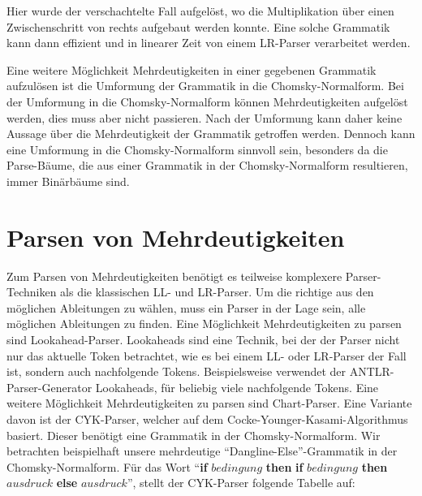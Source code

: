 \documentclass[runningheads]{llncs}
\begin{document}
    Hier wurde der verschachtelte Fall aufgelöst,
    wo die Multiplikation über einen Zwischenschritt von rechts aufgebaut werden konnte.
    Eine solche Grammatik kann dann effizient und in linearer Zeit von einem LR-Parser verarbeitet werden.

    Eine weitere Möglichkeit Mehrdeutigkeiten in einer gegebenen Grammatik aufzulösen
    ist die Umformung der Grammatik in die Chomsky-Normalform.
    Bei der Umformung in die Chomsky-Normalform können Mehrdeutigkeiten aufgelöst werden, dies muss aber nicht passieren\cite{kemp1974automata}.
    Nach der Umformung kann daher keine Aussage über die Mehrdeutigkeit der Grammatik getroffen werden.
    Dennoch kann eine Umformung in die Chomsky-Normalform sinnvoll sein, besonders da die Parse-Bäume,
    die aus einer Grammatik in der Chomsky-Normalform resultieren, immer Binärbäume sind\cite{watrous2020parse}.



    \newpage


    \section{Parsen von Mehrdeutigkeiten}\label{sec:parsen-von-mehrdeutigkeiten}

    Zum Parsen von Mehrdeutigkeiten benötigt es teilweise komplexere Parser-\\Techniken als die klassischen LL- und LR-Parser\cite{thorup1994controlled}.
    Um die richtige aus den möglichen Ableitungen zu wählen,
    muss ein Parser in der Lage sein, alle möglichen Ableitungen zu finden.
    Eine Möglichkeit Mehrdeutigkeiten zu parsen sind Lookahead-Parser.
    Lookaheads sind eine Technik, bei der der Parser nicht nur das aktuelle Token betrachtet,
    wie es bei einem LL- oder LR-Parser der Fall ist, sondern auch nachfolgende Tokens.
    Beispielsweise verwendet der ANTLR-Parser-Generator Lookaheads,
    für beliebig viele nachfolgende Tokens\cite{parr2024definitive}.
    Eine weitere Möglichkeit Mehrdeutigkeiten zu parsen sind Chart-Parser.
    Eine Variante davon ist der CYK-Parser\cite{klaus2009cky}, welcher auf dem Cocke-Younger-Kasami-Algorithmus basiert.
    Dieser benötigt eine Grammatik in der Chomsky-Normalform.
    Wir betrachten beispielhaft unsere mehrdeutige ``Dangline-Else''-Grammatik in der Chomsky-Normalform.
    Für das Wort ``\textbf{if} $bedingung$ \textbf{then} \textbf{if} $bedingung$ \textbf{then} $ausdruck$ \textbf{else} $ausdruck$'',
    stellt der CYK-Parser folgende Tabelle auf:
\end{document}
